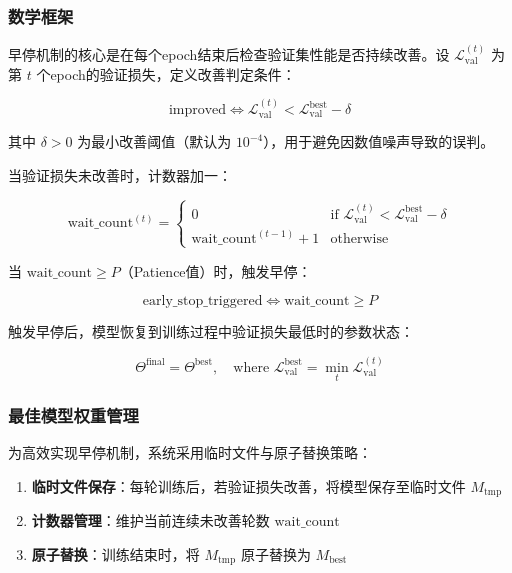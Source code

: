 \subsubsection{数学框架}

早停机制的核心是在每个epoch结束后检查验证集性能是否持续改善。设 $\mathcal{L}_{\text{val}}^{(t)}$ 为第 $t$ 个epoch的验证损失，定义改善判定条件：

\begin{equation}
\text{improved} \iff \mathcal{L}_{\text{val}}^{(t)} < \mathcal{L}_{\text{val}}^{\text{best}} - \delta
\end{equation}

其中 $\delta > 0$ 为最小改善阈值（默认为 $10^{-4}$），用于避免因数值噪声导致的误判。

当验证损失未改善时，计数器加一：

\begin{equation}
\text{wait\_count}^{(t)} = \begin{cases}
0 & \text{if } \mathcal{L}_{\text{val}}^{(t)} < \mathcal{L}_{\text{val}}^{\text{best}} - \delta \\
\text{wait\_count}^{(t-1)} + 1 & \text{otherwise}
\end{cases}
\end{equation}

当 $\text{wait\_count} \geq P$（Patience值）时，触发早停：

\begin{equation}
\text{early\_stop\_triggered} \iff \text{wait\_count} \geq P
\end{equation}

触发早停后，模型恢复到训练过程中验证损失最低时的参数状态：

\begin{equation}
\Theta^{\text{final}} = \Theta^{\text{best}}, \quad \text{where } \mathcal{L}_{\text{val}}^{\text{best}} = \min_t \mathcal{L}_{\text{val}}^{(t)}
\end{equation}

\subsubsection{最佳模型权重管理}

为高效实现早停机制，系统采用临时文件与原子替换策略：

\begin{enumerate}
    \item \textbf{临时文件保存}：每轮训练后，若验证损失改善，将模型保存至临时文件 $M_{\text{tmp}}$
    \item \textbf{计数器管理}：维护当前连续未改善轮数 $\text{wait\_count}$
    \item \textbf{原子替换}：训练结束时，将 $M_{\text{tmp}}$ 原子替换为 $M_{\text{best}}$
\end{enumerate}

